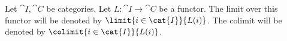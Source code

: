 \begin{notation}
Let $\cat{I},\cat{C}$ be categories.
Let $L: \cat{I} \rightarrow \cat{C}$ be a functor.
The limit over this functor will be denoted by
$\limit{i \in \cat{I}}{L(i)}$.
The colimit will be denoted by
$\colimit{i \in \cat{I}}{L(i)}$.
\end{notation}
